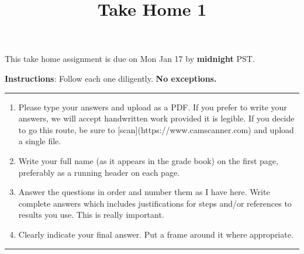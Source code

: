 \documentclass[
]{article}
\title{Take Home 1}
\author{}
\date{\vspace{-2.5em}}
\begin{document}
\maketitle

This take home assignment is due on Mon Jan 17 by \textbf{midnight} PST.

\textbf{Instructions}: Follow each one diligently.
\textbf{No exceptions.}

\hrule
\begin{enumerate}
    \item Please type your answers and upload as a PDF. If you prefer to write your answers, we will accept handwritten work provided it is legible. If you decide to go this route, be sure to [scan](https://www.camscanner.com) and upload a single file.  
    \item Write your full name (as it appears in the grade book) on the first page, preferably as a running header on each page.
    \item Answer the questions in order and number them as I have here. Write complete answers which includes justifications for steps and/or references to results you use. This is really important.
    \item Clearly indicate your final answer. Put a frame around it where appropriate.
\end{enumerate}
\hrule
\end{document}
